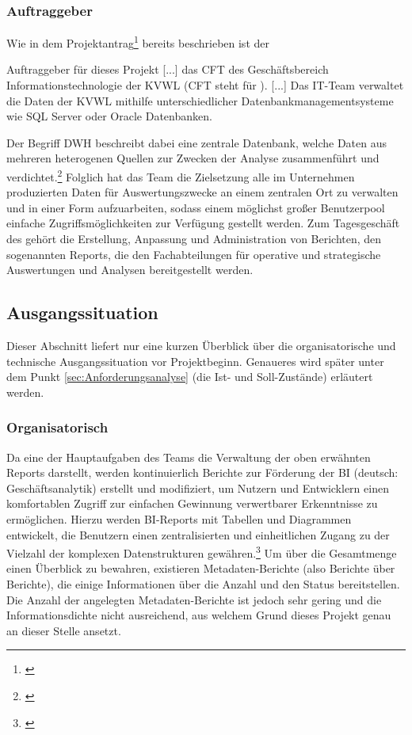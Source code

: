 \subsubsection{Auftraggeber} 
\label{sec:Auftraggeber}
Wie in dem Projektantrag\footnote{\cite{Projektantrag}} bereits beschrieben ist der
\begin{displayquote}
	Auftraggeber für dieses Projekt [...] das \acs{CFT} \teamName des Geschäftsbereich Informationstechnologie der \ac{KVWL} (\acs{CFT} steht für ).
	[...]
	Das IT-Team \teamName verwaltet die Daten der \ac{KVWL} mithilfe unterschiedlicher Datenbankmanagementsysteme wie SQL Server oder Oracle Datenbanken.
\end{displayquote}
Der Begriff \ac{DWH} beschreibt dabei eine zentrale Datenbank, welche Daten aus mehreren heterogenen Quellen zur Zwecken der Analyse zusammenführt und verdichtet.\footnote{\Vgl \cite{wiki:dwh}}
Folglich hat das Team die Zielsetzung alle im Unternehmen produzierten Daten für Auswertungszwecke an einem zentralen Ort zu verwalten und in einer Form aufzuarbeiten, sodass einem möglichst großer Benutzerpool einfache Zugriffsmöglichkeiten zur Verfügung gestellt werden.
Zum Tagesgeschäft des \teamName gehört die Erstellung, Anpassung und Administration von Berichten, den sogenannten Reports, die den Fachabteilungen für operative und strategische Auswertungen und Analysen bereitgestellt werden.

\subsection{Ausgangssituation} 
\label{sec:Ausgangssituation}
Dieser Abschnitt liefert nur eine kurzen Überblick über die organisatorische und technische Ausgangssituation vor Projektbeginn. Genaueres wird später unter dem Punkt \ref{sec:Anforderungsanalyse} (\ua die Ist- und Soll-Zustände) erläutert werden.

\subsubsection{Organisatorisch}
\label{sec:Ausgangssituation:Organisatorisch}
Da eine der Hauptaufgaben des Teams die Verwaltung der oben erwähnten Reports darstellt, werden kontinuierlich Berichte zur Förderung der \ac{BI} (deutsch: Geschäftsanalytik) erstellt und modifiziert, um Nutzern und Entwicklern einen komfortablen Zugriff zur einfachen Gewinnung verwertbarer Erkenntnisse zu ermöglichen. Hierzu werden \ac{BI}-Reports mit Tabellen und Diagrammen entwickelt, die Benutzern einen zentralisierten und einheitlichen Zugang zu der Vielzahl der komplexen Datenstrukturen gewähren.\footnote{\Vgl \cite{Projektantrag}}
Um über die Gesamtmenge einen Überblick zu bewahren, existieren Metadaten-Berichte (also Berichte über Berichte), die einige Informationen \zB über die Anzahl und den Status bereitstellen.
Die Anzahl der angelegten Metadaten-Berichte ist jedoch sehr gering und die Informationsdichte nicht ausreichend, aus welchem Grund dieses Projekt genau an dieser Stelle ansetzt.

